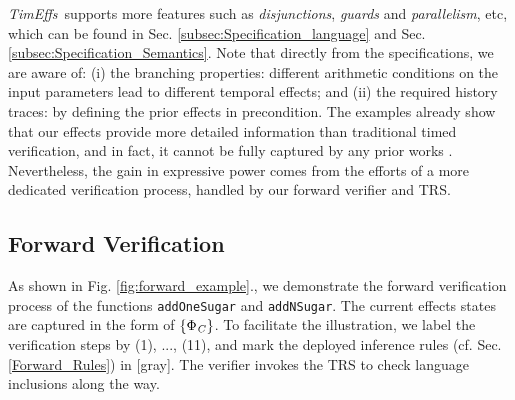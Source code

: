 \documentclass[acmsmall,10pt,review]{acmart}
\newcommand{\codem}[1]{{\lstinline[basicstyle=\small\ttfamily]|#1|}}
\newcommand{\timedEffects}{\emph{TimEffs}}
\newcommand{\effect}{{\ensuremath{\mathrm{\Phi}}}}
\newcommand{\code}[1]{{\tt{\ensuremath{\m{#1}}}}}
\newcommand{\m}{\mathit}
\newcommand\figref[1]{Fig. \textcolor{black}{\ref{#1}}.}
\newcommand\secref[1]{Sec. \textcolor{black}{\ref{#1}}}
\begin{document}
\timedEffects\ supports more features such as \emph{disjunctions}, 
\emph{guards} and \emph{parallelism}, etc, which can be found in 
\secref{subsec:Specification_language} and 
\secref{subsec:Specification_Semantics}.  
Note that directly from the specifications, we are aware of:  
(i) the branching properties: different arithmetic conditions on the input parameters lead to different temporal effects;
and (ii) the required history traces: by defining the prior effects 
in precondition. 
The examples 
already show that our  effects provide more detailed information than 
traditional timed verification, and in fact, it cannot be fully 
captured by any prior works \cite{DBLP:journals/tse/WangSWQ17,DBLP:journals/sttt/LarsenPY97,DBLP:journals/sttt/Yovine97,DBLP:conf/seke/WangWH05}.
Nevertheless, the gain in expressive power comes from the efforts 
of a more dedicated verification process, handled by our forward verifier and TRS.








\subsection{Forward Verification}
As shown in \figref{fig:forward_example}, we demonstrate the 
forward verification process of the functions \codem{addOneSugar} and   {\codem{addNSugar}}.
The current effects states are captured 
in the form of 
\code{\{ \textcolor{darklavender}{\effect_C} \}}. 
To facilitate the illustration, we label the verification 
steps by (1), ..., (11), and mark the deployed inference 
rules (cf. \secref{Forward_Rules}) in \textcolor{mGray}{[gray]}.
The verifier invokes the TRS to check language inclusions along the way.

\end{document}
